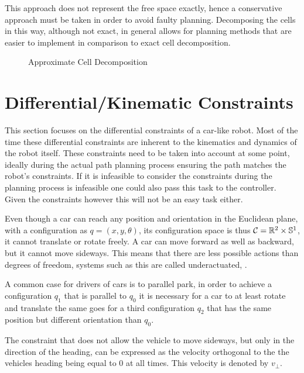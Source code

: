 This approach does not represent the free space exactly, hence a conservative approach must be taken in order to avoid faulty planning. Decomposing the cells in this way, although not exact, in general allows for planning methods that are easier to implement in comparison to exact cell decomposition. \cite{Latombe.1991}

\begin{figure}[h]
    \caption{Approximate Cell Decomposition}
    \label{fig:cellDecomposition}
\end{figure}

\section{Differential/Kinematic Constraints}\label{sec:differentialConstraints}
This section focuses on the differential constraints of a car-like robot. Most of the time these differential constraints are inherent to the kinematics and dynamics of the robot itself. These constraints need to be taken into account at some point, ideally during the actual path planning process ensuring the path matches the robot's constraints. If it is infeasible to consider the constraints during the planning process is infeasible one could also pass this task to the controller. Given the constraints however this will not be an easy task either. \cite{LaValle.2006}

Even though a car can reach any position and orientation in the Euclidean plane, with a configuration as $q = (x,y,\theta)$, its configuration space is thus $\mathcal{C} = \mathbb{R}^2 \times \mathbb{S}^1$, it cannot translate or rotate freely. A car can move forward as well as backward, but it cannot move sideways. This means that there are less possible actions than degrees of freedom, systems such as this are called underactuated, \cite{LaValle.2006}.

A common case for drivers of cars is to parallel park, in order to achieve a configuration $q_1$ that is parallel to $q_0$ it is necessary for a car to at least rotate and translate the same goes for a third configuration $q_2$ that has the same position but different orientation than $q_0$. \cite{Latombe.1991}

The constraint that does not allow the vehicle to move sideways, but only in the direction of the heading, can be expressed as the velocity orthogonal to the the vehicles heading being equal to 0 at all times. This velocity is denoted by $v_\perp$.

